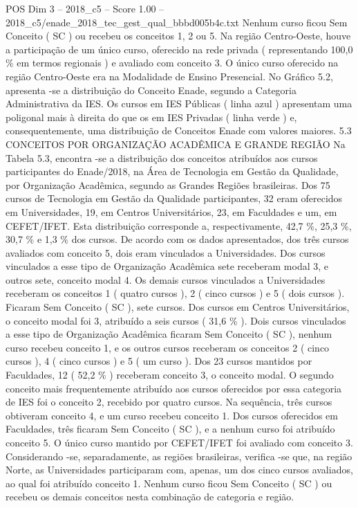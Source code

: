 \begin{textsample}{POS Dim 3 – 2018\_c5 – Score 1.00 – 2018\_c5/enade\_2018\_tec\_gest\_qual\_bbbd005b4c.txt}
Nenhum curso ficou Sem Conceito ( SC ) ou recebeu os conceitos 1, 2 ou 5.
Na região Centro-Oeste, houve a participação de um único curso, oferecido na rede privada ( representando 100,0 \% em termos regionais ) e avaliado com conceito 3.
O único curso oferecido na região Centro-Oeste era na Modalidade de Ensino Presencial.
No Gráfico 5.2, apresenta -se a distribuição do Conceito Enade, segundo a Categoria Administrativa da IES.
Os cursos em IES Públicas ( linha azul ) apresentam uma poligonal mais à direita do que os em IES Privadas ( linha verde ) e, consequentemente, uma distribuição de Conceitos Enade com valores maiores. 5.3 CONCEITOS POR ORGANIZAÇÃO ACADÊMICA E GRANDE REGIÃO Na Tabela 5.3, encontra -se a distribuição dos conceitos atribuídos aos cursos participantes do Enade/2018, na Área de Tecnologia em Gestão da Qualidade, por Organização Acadêmica, segundo as Grandes Regiões brasileiras.
Dos 75 cursos de Tecnologia em Gestão da Qualidade participantes, 32 eram oferecidos em Universidades, 19, em Centros Universitários, 23, em Faculdades e um, em CEFET/IFET.
Esta distribuição corresponde a, respectivamente, 42,7 \%, 25,3 \%, 30,7 \% e 1,3 \% dos cursos.
De acordo com os dados apresentados, dos três cursos avaliados com conceito 5, dois eram vinculados a Universidades.
Dos cursos vinculados a esse tipo de Organização Acadêmica sete receberam modal 3, e outros sete, conceito modal 4.
Os demais cursos vinculados a Universidades receberam os conceitos 1 ( quatro cursos ), 2 ( cinco cursos ) e 5 ( dois cursos ).
Ficaram Sem Conceito ( SC ), sete cursos.
Dos cursos em Centros Universitários, o conceito modal foi 3, atribuído a seis cursos ( 31,6 \% ).
Dois cursos vinculados a esse tipo de Organização Acadêmica ficaram Sem Conceito ( SC ), nenhum curso recebeu conceito 1, e os outros cursos receberam os conceitos 2 ( cinco cursos ), 4 ( cinco cursos ) e 5 ( um curso ).
Dos 23 cursos mantidos por Faculdades, 12 ( 52,2 \% ) receberam conceito 3, o conceito modal.
O segundo conceito mais frequentemente atribuído aos cursos oferecidos por essa categoria de IES foi o conceito 2, recebido por quatro cursos.
Na sequência, três cursos obtiveram conceito 4, e um curso recebeu conceito 1.
Dos cursos oferecidos em Faculdades, três ficaram Sem Conceito ( SC ), e a nenhum curso foi atribuído conceito 5.
O único curso mantido por CEFET/IFET foi avaliado com conceito 3.
Considerando -se, separadamente, as regiões brasileiras, verifica -se que, na região Norte, as Universidades participaram com, apenas, um dos cinco cursos avaliados, ao qual foi atribuído conceito 1.
Nenhum curso ficou Sem Conceito ( SC ) ou recebeu os demais conceitos nesta combinação de categoria e região.

\end{textsample}
